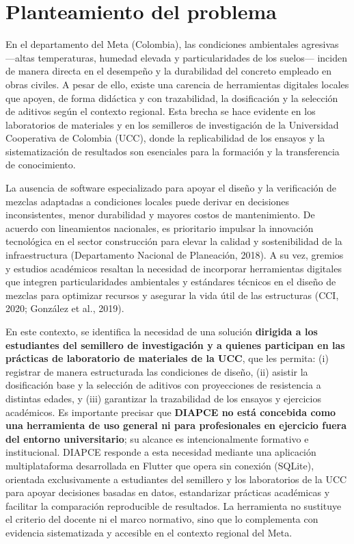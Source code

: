 \section{Planteamiento del problema}

En el departamento del Meta (Colombia), las condiciones ambientales agresivas —altas temperaturas, humedad elevada y particularidades de los suelos— inciden de manera directa en el desempeño y la durabilidad del concreto empleado en obras civiles. A pesar de ello, existe una carencia de herramientas digitales locales que apoyen, de forma didáctica y con trazabilidad, la dosificación y la selección de aditivos según el contexto regional. Esta brecha se hace evidente en los laboratorios de materiales y en los semilleros de investigación de la Universidad Cooperativa de Colombia (UCC), donde la replicabilidad de los ensayos y la sistematización de resultados son esenciales para la formación y la transferencia de conocimiento.

La ausencia de software especializado para apoyar el diseño y la verificación de mezclas adaptadas a condiciones locales puede derivar en decisiones inconsistentes, menor durabilidad y mayores costos de mantenimiento. De acuerdo con lineamientos nacionales, es prioritario impulsar la innovación tecnológica en el sector construcción para elevar la calidad y sostenibilidad de la infraestructura (Departamento Nacional de Planeación, 2018). A su vez, gremios y estudios académicos resaltan la necesidad de incorporar herramientas digitales que integren particularidades ambientales y estándares técnicos en el diseño de mezclas para optimizar recursos y asegurar la vida útil de las estructuras (CCI, 2020; González et al., 2019).

En este contexto, se identifica la necesidad de una solución \textbf{dirigida a los estudiantes del semillero de investigación y a quienes participan en las prácticas de laboratorio de materiales de la UCC}, que les permita: (i) registrar de manera estructurada las condiciones de diseño, (ii) asistir la dosificación base y la selección de aditivos con proyecciones de resistencia a distintas edades, y (iii) garantizar la trazabilidad de los ensayos y ejercicios académicos. Es importante precisar que \textbf{DIAPCE no está concebida como una herramienta de uso general ni para profesionales en ejercicio fuera del entorno universitario}; su alcance es intencionalmente formativo e institucional. DIAPCE responde a esta necesidad mediante una aplicación multiplataforma desarrollada en Flutter que opera sin conexión (SQLite), orientada exclusivamente a estudiantes del semillero y los laboratorios de la UCC para apoyar decisiones basadas en datos, estandarizar prácticas académicas y facilitar la comparación reproducible de resultados. La herramienta no sustituye el criterio del docente ni el marco normativo, sino que lo complementa con evidencia sistematizada y accesible en el contexto regional del Meta.
